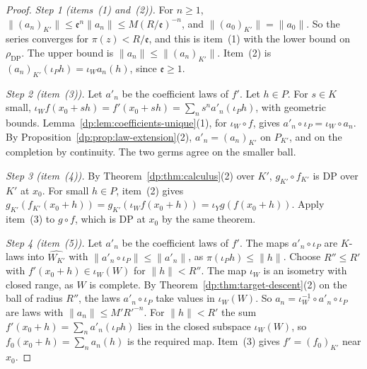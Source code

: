 \documentclass[11pt]{amsart}
\theoremstyle{definition}
\theoremstyle{remark}
\numberwithin{equation}{section}
\newcommand{\norm}[1]{\lVert #1\rVert}
\theoremstyle{plain}
\theoremstyle{definition}
\theoremstyle{plain}
\begin{document}
\begin{proof}
\emph{Step 1 (items~(1) and~(2)).} For $n\ge1$, $\norm{(a_n)_{K'}}\le\mathfrak e^n\norm{a_n}\le M(R/\mathfrak e)^{-n}$, and $\norm{(a_0)_{K'}}=\norm{a_0}$. So the series converges for $\pi(z)<R/\mathfrak e$, and this is item~(1) with the lower bound on $\rho_{\mathrm{DP}}$. The upper bound is $\norm{a_n}\le\norm{(a_n)_{K'}}$. Item~(2) is $(a_n)_{K'}(\iota_Ph)=\iota_Wa_n(h)$, since $\mathfrak e\ge1$.

\emph{Step 2 (item~(3)).} Let $a'_n$ be the coefficient laws of $f'$. Let $h\in P$. For $s\in K$ small, $\iota_Wf(x_0+sh)=f'(x_0+sh)=\sum_ns^na'_n(\iota_Ph)$, with geometric bounds. Lemma~\ref{dp:lem:coefficients-unique}(1), for $\iota_W\circ f$, gives $a'_n\circ\iota_P=\iota_W\circ a_n$. By Proposition~\ref{dp:prop:law-extension}(2), $a'_n=(a_n)_{K'}$ on $P_{K'}$, and on the completion by continuity. The two germs agree on the smaller ball.

\emph{Step 3 (item~(4)).} By Theorem~\ref{dp:thm:calculus}(2) over $K'$, $g_{K'}\circ f_{K'}$ is DP over $K'$ at $x_0$. For small $h\in P$, item~(2) gives $g_{K'}(f_{K'}(x_0+h))=g_{K'}(\iota_Wf(x_0+h))=\iota_Yg(f(x_0+h))$. Apply item~(3) to $g\circ f$, which is DP at $x_0$ by the same theorem.

\emph{Step 4 (item~(5)).} Let $a'_n$ be the coefficient laws of $f'$. The maps $a'_n\circ\iota_P$ are $K$-laws into $\widehat{W_{K'}}$ with $\norm{a'_n\circ\iota_P}\le\norm{a'_n}$, as $\pi(\iota_Ph)\le\norm h$. Choose $R''\le R'$ with $f'(x_0+h)\in\iota_W(W)$ for $\norm h<R''$. The map $\iota_W$ is an isometry with closed range, as $W$ is complete. By Theorem~\ref{dp:thm:target-descent}(2) on the ball of radius $R''$, the laws $a'_n\circ\iota_P$ take values in $\iota_W(W)$. So $a_n=\iota_W^{-1}\circ a'_n\circ\iota_P$ are laws with $\norm{a_n}\le M'R'^{-n}$. For $\norm h<R'$ the sum $f'(x_0+h)=\sum_na'_n(\iota_Ph)$ lies in the closed subspace $\iota_W(W)$, so $f_0(x_0+h)=\sum_na_n(h)$ is the required map. Item~(3) gives $f'=(f_0)_{K'}$ near $x_0$.
\end{proof}
\end{document}

